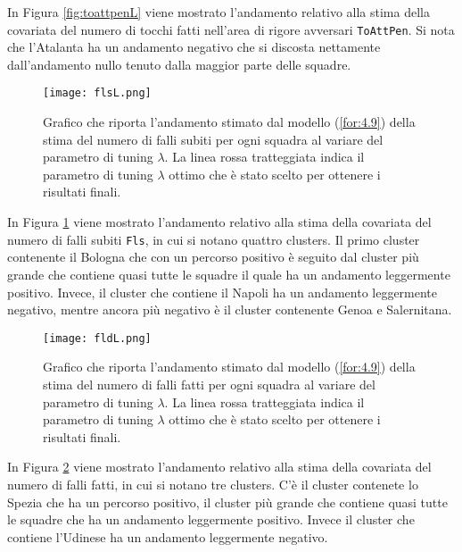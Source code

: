 In Figura \ref{fig:toattpenL} viene mostrato l'andamento relativo alla stima della covariata del numero di tocchi fatti nell'area di rigore avversari \texttt{ToAttPen}. Si nota che l'Atalanta ha un andamento negativo che si discosta nettamente dall'andamento nullo tenuto dalla maggior parte delle squadre.

\begin{figure}[htbp]
	\begin{center}
		\texttt{[image: flsL.png]}
		\caption{Grafico che riporta l'andamento stimato dal modello (\ref{for:4.9}) della stima del numero di falli subiti per ogni squadra al variare del parametro di tuning $\lambda$. La linea rossa tratteggiata indica il parametro di tuning $\lambda$ ottimo che è stato scelto per ottenere i risultati finali.} \label{fig:flsL}
	\end{center}
\end{figure}

In Figura \ref{fig:flsL} viene mostrato l'andamento relativo alla stima della covariata del numero di falli subiti \texttt{Fls}, in cui si notano quattro clusters. Il primo cluster contenente il Bologna che con un percorso positivo è seguito dal cluster più grande che contiene quasi tutte le squadre il quale ha un andamento leggermente positivo. Invece, il cluster che contiene il Napoli ha un andamento leggermente negativo, mentre ancora più negativo è il cluster contenente Genoa e Salernitana.

\begin{figure}[htbp]
	\begin{center}
		\texttt{[image: fldL.png]}
		\caption{Grafico che riporta l'andamento stimato dal modello (\ref{for:4.9}) della stima del numero di falli fatti per ogni squadra al variare del parametro di tuning $\lambda$. La linea rossa tratteggiata indica il parametro di tuning $\lambda$ ottimo che è stato scelto per ottenere i risultati finali.} \label{fig:fldL}
	\end{center}
\end{figure}

In Figura \ref{fig:fldL} viene mostrato l'andamento relativo alla stima della covariata del numero di falli fatti, in cui si notano tre clusters. C'è il cluster contenete lo Spezia che ha un percorso positivo, il cluster più grande che contiene quasi tutte le squadre che ha un andamento leggermente positivo. Invece il cluster che contiene l'Udinese ha un andamento leggermente negativo.

